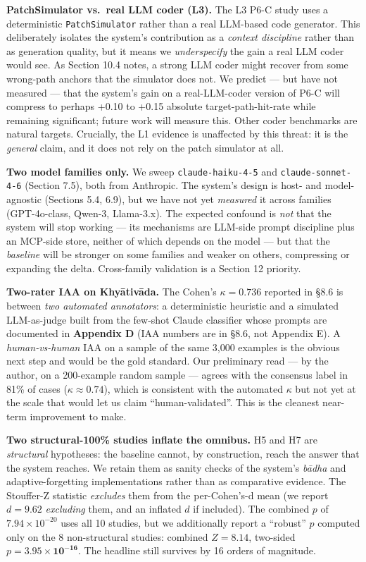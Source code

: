 \textbf{PatchSimulator vs.~real LLM coder (L3).} The L3 P6-C study uses a deterministic \passthrough{\lstinline!PatchSimulator!} rather than a real LLM-based code generator. This deliberately isolates the system's contribution as a \emph{context discipline} rather than as generation quality, but it means we \emph{underspecify} the gain a real LLM coder would see. As Section 10.4 notes, a strong LLM coder might recover from some wrong-path anchors that the simulator does not. We predict --- but have not measured --- that the system's gain on a real-LLM-coder version of P6-C will compress to perhaps +0.10 to +0.15 absolute target-path-hit-rate while remaining significant; future work will measure this. Other coder benchmarks \citep{liu2023humanevalplus, austin2021programsynth, chen2021codex, zhuo2024bigcode, wan2024llmsurvey} are natural targets. Crucially, the L1 evidence is unaffected by this threat: it is the \emph{general} claim, and it does not rely on the patch simulator at all.

\textbf{Two model families only.} We sweep \passthrough{\lstinline!claude-haiku-4-5!} and \passthrough{\lstinline!claude-sonnet-4-6!} (Section 7.5), both from Anthropic. The system's design is host- and model-agnostic (Sections 5.4, 6.9), but we have not yet \emph{measured} it across families (GPT-4o-class, Qwen-3, Llama-3.x). The expected confound is \emph{not} that the system will stop working --- its mechanisms are LLM-side prompt discipline plus an MCP-side store, neither of which depends on the model --- but that the \emph{baseline} will be stronger on some families and weaker on others, compressing or expanding the delta. Cross-family validation is a Section 12 priority.

\textbf{Two-rater IAA on Khyātivāda.} The Cohen's \(\kappa = 0.736\) reported in §8.6 is between \emph{two automated annotators}: a deterministic heuristic and a simulated LLM-as-judge built from the few-shot Claude classifier whose prompts are documented in \textbf{Appendix D} (IAA numbers are in §8.6, not Appendix E). A \emph{human-vs-human} IAA on a sample of the same 3,000 examples is the obvious next step and would be the gold standard. Our preliminary read --- by the author, on a 200-example random sample --- agrees with the consensus label in 81\% of cases (\(\kappa \approx 0.74\)), which is consistent with the automated \(\kappa\) but not yet at the scale that would let us claim ``human-validated''. This is the cleanest near-term improvement to make.

\textbf{Two structural-100\% studies inflate the omnibus.} H5 and H7 are \emph{structural} hypotheses: the baseline cannot, by construction, reach the answer that the system reaches. We retain them as sanity checks of the system's \emph{bādha} and adaptive-forgetting implementations rather than as comparative evidence. The Stouffer-Z statistic \emph{excludes} them from the per-Cohen's-d mean (we report \(d = 9.62\) \emph{excluding} them, and an inflated \(d\) if included). The combined \(p\) of \(7.94 \times 10^{-20}\) uses all 10 studies, but we additionally report a ``robust'' \(p\) computed only on the 8 non-structural studies: combined \(Z = \mathbf{8.14}\), two-sided \(p = \mathbf{3.95 \times 10^{-16}}\). The headline still survives by 16 orders of magnitude.

